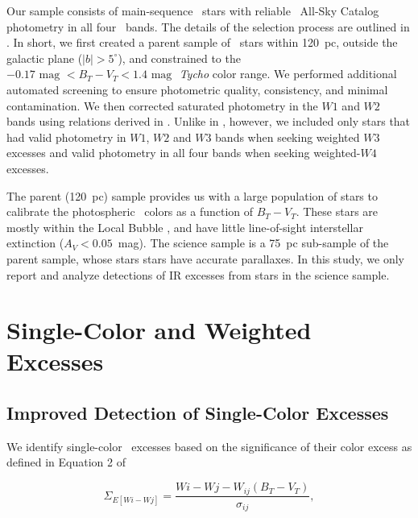       Our sample consists of main-sequence \hip\ stars with reliable \WS\ All-Sky Catalog photometry in all four \WS\ bands. The details of the selection process are outlined in . In short, we first created a parent sample of \hip\ stars within 120~pc, outside the galactic plane ($|b|>5^{\circ}$), and constrained to the $-0.17\mbox{ mag }<B_T-V_T<1.4\mbox{ mag }$ \textit{Tycho} color range. We performed additional automated screening to ensure photometric quality, consistency, and minimal contamination. We then corrected saturated photometry in the $W1$ and $W2$ bands using relations derived in . Unlike in , however, we included only stars that had valid photometry in $W1$, $W2$ and $W3$ bands when seeking weighted $W3$ excesses and valid photometry in all four bands when seeking weighted-$W4$ excesses.
    
  The parent (120~pc) sample provides us with a large population of stars to calibrate the photospheric \WS\ colors as a function of $B_T-V_T$. These stars are mostly within the Local Bubble \citep{Lallement2003}, and have little line-of-sight interstellar extinction ($A_V<0.05$~mag). The science sample is a 75~pc sub-sample of the parent sample, whose stars stars have accurate parallaxes. In this study, we only report and analyze detections of IR excesses from stars in the science sample.
  


\section{Single-Color and Weighted Excesses}
\label{sec:single_color_stuff}
   


   \subsection{Improved Detection of Single-Color Excesses}
    \label{sec:improved_detection}
        
        We identify single-color \WS\ excesses based on the significance of their color excess as defined in Equation 2 of 
        
\begin{equation}\label{eq:old_sig}
\Sigma_{E[Wi-Wj]} = \frac{Wi-Wj-W_{ij}(B_T-V_T)}{\sigma_{ij}},
\end{equation}        
        
